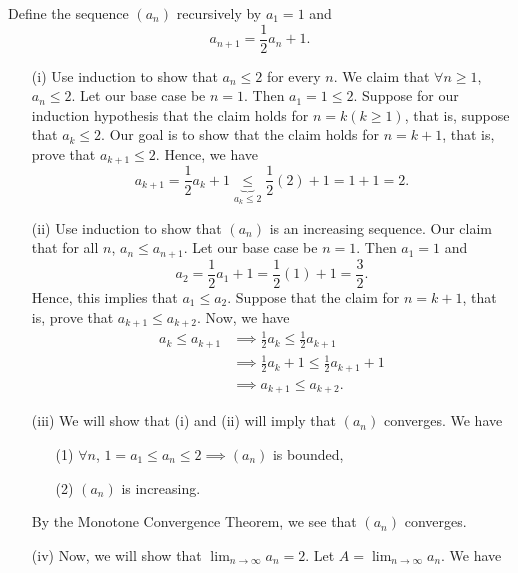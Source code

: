 \documentclass[a4paper]{article}
\begin{document}
\begin{eg}
   Define the sequence \( ({a}_{n}) \) recursively by \( {a}_{1} = 1  \) and  
   \[  {a}_{n+1} = \frac{ 1 }{ 2 } {a}_{n} + 1.  \]
   \begin{enumerate}
       \item[(i)] Use induction to show that \( {a}_{n} \leq 2  \) for every \( n  \). We claim that \( \forall n \geq 1  \), \( {a}_{n} \leq 2  \). Let our base case be \( n = 1   \). Then \( {a}_{1} =1  \leq 2  \). Suppose for our induction hypothesis that the claim holds for \( n = k (k \geq 1)  \), that is, suppose that \( {a}_{k } \leq 2  \). Our goal is to show that the claim holds for \( n = k + 1  \), that is, prove that \( {a}_{k+1} \leq 2  \). Hence, we have
           \[  {a}_{k+1} = \frac{ 1 }{ 2 }  {a}_{k } + 1 \underbrace{\leq}_{{a}_{k} \leq 2} \frac{ 1 }{ 2 }(2) + 1  = 1 + 1 = 2.  \]
       \item[(ii)] Use induction to show that \( ({a}_{n}) \) is an increasing sequence. Our claim that for all \( n  \), \( {a}_{n} \leq {a}_{n+1} \). Let our base case be \( n = 1  \). Then \( {a}_{1} = 1  \) and 
           \[ {a}_{2} = \frac{ 1 }{ 2 }  {a}_{1} + 1 = \frac{ 1 }{ 2 }(1) + 1 = \frac{ 3 }{ 2 }.    \]
           Hence, this implies that \( {a}_{1} \leq {a}_{2} \). Suppose that the claim for \( n = k + 1 \), that is, prove that \( {a}_{k+1} \leq {a}_{k+2} \). Now, we have 
           \begin{align*}
               {a}_{k } \leq {a}_{k+1} &\implies \frac{ 1 }{ 2 }  {a}_{k } \leq \frac{ 1 }{ 2 }  {a}_{k+1}  \\
                                       &\implies \frac{ 1 }{ 2 }  {a}_{k } + 1 \leq \frac{ 1 }{ 2 }  {a}_{k+1} + 1 \\
                                       &\implies {a}_{k+1} \leq {a}_{k+2}.
       \end{align*}
    \item[(iii)] We will show that (i) and (ii) will imply that \( ({a}_{n}) \) converges. We have 
        \begin{enumerate}
            \item[(1)] \( \forall n  \), \( 1 = {a}_{1} \leq {a}_{n} \leq 2 \implies ({a}_{n})   \) is bounded,
            \item[(2)] \( ({a}_{n}) \) is increasing.
        \end{enumerate}
        By the Monotone Convergence Theorem, we see that \( ({a}_{n}) \) converges.
    \item[(iv)] Now, we will show that \( \lim_{ n \to \infty  }  {a}_{n} = 2 \). Let \( A = \lim_{ n \to \infty  }  {a}_{n} \). We have

\end{enumerate}
\end{eg}
\end{document}
